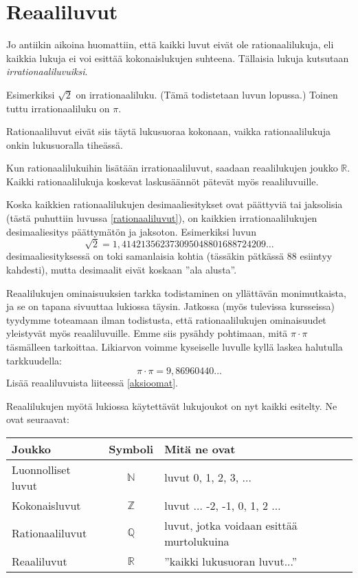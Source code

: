 \chapter{Reaaliluvut}

Jo antiikin aikoina huomattiin, että kaikki luvut eivät ole rationaalilukuja, eli kaikkia lukuja ei voi esittää kokonaislukujen suhteena. Tällaisia lukuja kutsutaan \emph{irrationaaliluvuiksi}.

Esimerkiksi $\sqrt{2}$ on irrationaaliluku. (Tämä todistetaan
luvun lopussa.) Toinen tuttu irrationaaliluku on $\pi$.

Rationaaliluvut eivät siis täytä lukusuoraa kokonaan, vaikka
rationaalilukuja onkin lukusuoralla tiheässä.


Kun rationaalilukuihin lisätään irrationaaliluvut, saadaan reaalilukujen joukko $\mathbb{R}$. Kaikki rationaalilukuja koskevat
laskusäännöt pätevät myös reaaliluvuille.

Koska kaikkien rationaalilukujen desimaaliesitykset ovat päättyviä tai jaksolisia (tästä puhuttiin luvussa \ref{rationaaliluvut}), on
kaikkien irrationaalilukujen desimaaliesitys päättymätön ja jaksoton. Esimerkiksi luvun
\[\sqrt{2}= 1,414213562373095048801688724209\ldots\]
desimaaliesityksessä on toki samanlaisia kohtia
(tässäkin pätkässä 88 esiintyy kahdesti), mutta desimaalit eivät koskaan ''ala alusta''.

Reaalilukujen ominaisuuksien tarkka todistaminen on yllättävän monimutkaista, ja se on tapana sivuuttaa lukiossa täysin. Jatkossa
(myös tulevissa kursseissa) tyydymme toteamaan ilman todistusta, että rationaalilukujen ominaisuudet yleistyvät myös reaaliluvuille.
Emme siis pysähdy pohtimaan, mitä $\pi \cdot \pi$ täsmälleen tarkoittaa. Likiarvon voimme kyseiselle luvulle kyllä laskea
halutulla tarkkuudella:
\[ \pi\cdot \pi =9,86960440\ldots \]
Lisää reaaliluvuista liiteessä \ref{aksioomat}.

Reaalilukujen myötä lukiossa käytettävät lukujoukot on nyt kaikki esitelty. Ne ovat seuraavat:
\begin{center}\begin{tabular}{l|c|l}
Joukko & Symboli & Mitä ne ovat\\
\hline
Luonnolliset luvut & $\mathbb{N}$ &
luvut 0, 1, 2, 3, $\ldots$ \\
Kokonaisluvut & $\mathbb{Z}$ & luvut $\ldots$ -2, -1, 0, 1, 2 $\ldots$ \\
Rationaaliluvut & $\mathbb{Q}$ & luvut, jotka voidaan esittää
murtolukuina \\
Reaaliluvut & $\mathbb{R}$ & ''kaikki lukusuoran luvut...''
\end{tabular} \end{center}


